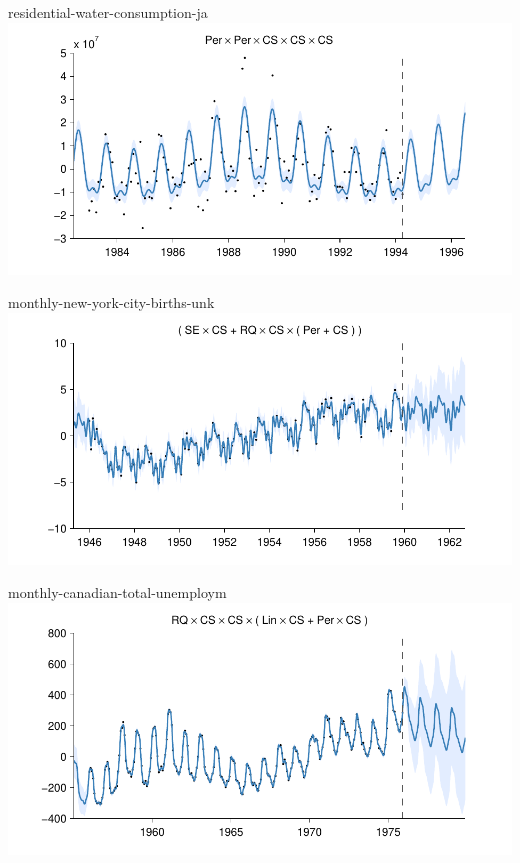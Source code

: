 \begin{frame}{residential-water-consumption-ja}
  \center
  \includegraphics[width=1.0\textwidth]{figures/residential-water-consumption-ja/residential-water-consumption-ja_all}
\end{frame} 

\begin{frame}{monthly-new-york-city-births-unk}
  \center
  \includegraphics[width=1.0\textwidth]{figures/monthly-new-york-city-births-unk/monthly-new-york-city-births-unk_all}
\end{frame}   

\begin{frame}{monthly-canadian-total-unemploym}
  \center
  \includegraphics[width=1.0\textwidth]{figures/monthly-canadian-total-unemploym/monthly-canadian-total-unemploym_all}
\end{frame}  

